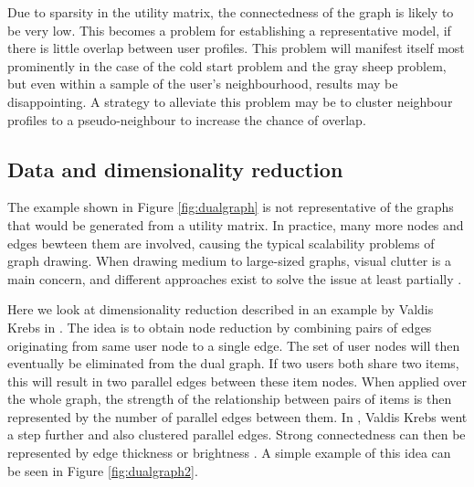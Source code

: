 \documentclass[a4paper,10pt,twocolumn]{article}
\begin{document}
Due to sparsity in the utility matrix, the connectedness of the graph is likely to be very low. This becomes a problem for establishing a representative model, if there is little overlap between user profiles. This problem will manifest itself most prominently in the case of the cold start problem and the gray sheep problem, but even within a sample of the user's neighbourhood, results may be disappointing. A strategy to alleviate this problem may be to cluster neighbour profiles to a pseudo-neighbour to increase the chance of overlap.


\subsection*{Data and dimensionality reduction}

The example shown in Figure \ref{fig:dualgraph} is not representative of the graphs that would be generated from a utility matrix. In practice, many more nodes and edges bewteen them are involved, causing the typical scalability problems of graph drawing. When drawing medium to large-sized graphs, visual clutter is a main concern, and different approaches exist to solve the issue at least partially \cite{herman2000, holten2009, ellis2007, shirley2009, ware2004}.

Here we look at dimensionality reduction described in an example by Valdis Krebs in \cite{steele2010}. The idea is to obtain node reduction by combining pairs of edges originating from same user node to a single edge. The set of user nodes will then eventually be eliminated from the dual graph. If two users both share two items, this will result in two parallel edges between these item nodes. When applied over the whole graph, the strength of the relationship between pairs of items is then represented by the number of parallel edges between them. In \cite{steele2010}, Valdis Krebs went a step further and also clustered parallel edges. Strong connectedness can then be represented by edge thickness or brightness \cite{steele2010, shirley2009}. A simple example of this idea can be seen in Figure \ref{fig:dualgraph2}.
\end{document}
